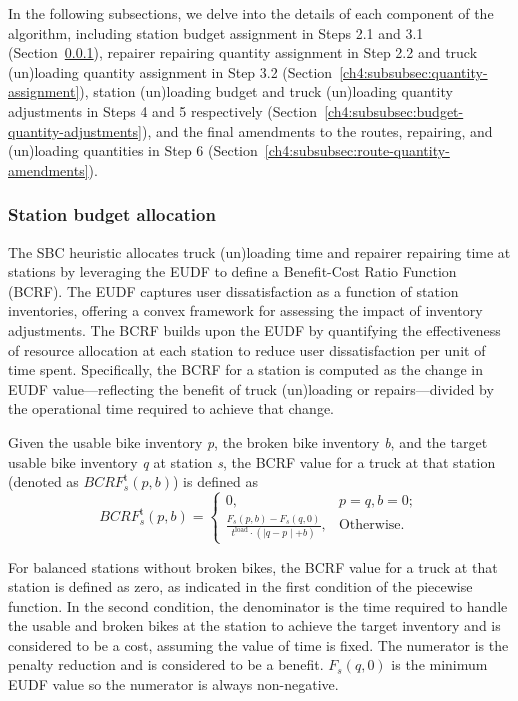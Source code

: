 In the following subsections, we delve into the details of each component of the algorithm,
including station budget assignment in Steps 2.1 and 3.1 (Section~\ref{ch4:subsubsec:station-budget-allocation}), repairer repairing
quantity assignment in Step 2.2 and truck (un)loading quantity assignment in Step 3.2
(Section~\ref{ch4:subsubsec:quantity-assignment}), station (un)loading budget and truck (un)loading quantity adjustments in Steps 4 and 5
respectively (Section~\ref{ch4:subsubsec:budget-quantity-adjustments}), and the final amendments to the routes, repairing, and (un)loading
quantities in Step 6 (Section~\ref{ch4:subsubsec:route-quantity-amendments}).

\subsubsection{Station budget allocation}\label{ch4:subsubsec:station-budget-allocation}

The SBC heuristic allocates truck (un)loading time and repairer repairing time at stations by
leveraging the EUDF to define a Benefit-Cost Ratio Function (BCRF). The EUDF captures user
dissatisfaction as a function of station inventories, offering a convex framework for assessing the
impact of inventory adjustments. The BCRF builds upon the EUDF by quantifying the effectiveness of
resource allocation at each station to reduce user dissatisfaction per unit of time spent.
Specifically, the BCRF for a station is computed as the change in EUDF value---reflecting the
benefit of truck (un)loading or repairs---divided by the operational time required to achieve that
change.

Given the usable bike inventory \emph{p}, the broken bike inventory \emph{b}, and the target usable
bike inventory \emph{q} at station \emph{s}, the BCRF value for a truck at that station (denoted as
\(\mathit{BCR}F_{s}^{\text{t}}\left( {p,b} \right)\)) is defined
as\begin{equation}
\label{ch4:eq:68}
\mathit{BCR}F_{s}^{\text{t}}\left( {p,b} \right) = \left\{ \begin{array}{lc}
{0,} & {p = q,b = 0;} \\
{\frac{F_{s}\left( {p,b} \right) - F_{s}\left( {q,0} \right)}{t^{\text{load}} \cdot \left( \left| q - p \middle| + b \right. \right)},} & {\text{Otherwise}\text{.}}
\end{array} \right.
\end{equation}

For balanced stations without broken bikes, the BCRF value for a truck at that station is defined as
zero, as indicated in the first condition of the piecewise function. In the second condition, the
denominator is the time required to handle the usable and broken bikes at the station to achieve the
target inventory and is considered to be a cost, assuming the value of time is fixed. The numerator
is the penalty reduction and is considered to be a benefit. \(F_{s}\left( {q,0} \right)\) is the
minimum EUDF value so the numerator is always non-negative.

